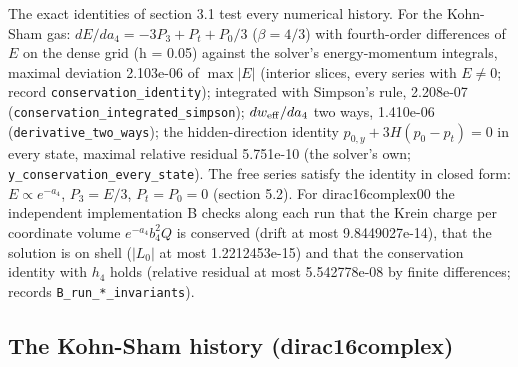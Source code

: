 \documentclass[11pt]{article}
\begin{document}
The exact identities of section 3.1 test every numerical history. For the Kohn-Sham gas: $dE/da_4 = -3P_3 + P_t + P_0/3$ ($\beta = 4/3$) with fourth-order differences of $E$ on the dense grid (h = 0.05) against the solver's energy-momentum integrals, maximal deviation 2.103e-06 of $\max\lvert E\rvert$ (interior slices, every series with $E \neq 0$; record \texttt{conserva\allowbreak{}tion\_ide\allowbreak{}ntity}); integrated with Simpson's rule, 2.208e-07 (\texttt{conserva\allowbreak{}tion\_int\allowbreak{}egrated\_\allowbreak{}simpson}); $dw_{\rm eff}/da_4$ two ways, 1.410e-06 (\texttt{derivati\allowbreak{}ve\_two\_w\allowbreak{}ays}); the hidden-direction identity $p_{0,y} + 3H(p_0 - p_t) = 0$ in every state, maximal relative residual 5.751e-10 (the solver's own; \texttt{y\_conser\allowbreak{}vation\_e\allowbreak{}very\_sta\allowbreak{}te}). The free series satisfy the identity in closed form: $E \propto e^{-a_4}$, $P_3 = E/3$, $P_t = P_0 = 0$ (section 5.2). For dirac16complex00 the independent implementation B checks along each run that the Krein charge per coordinate volume $e^{-a_4}b_4^2Q$ is conserved (drift at most 9.8449027e-14), that the solution is on shell ($|L_0|$ at most 1.2212453e-15) and that the conservation identity with $h_4$ holds (relative residual at most 5.542778e-08 by finite differences; records \texttt{B\_run\_*\_\allowbreak{}invarian\allowbreak{}ts}).

\subsection{The Kohn-Sham history (dirac16complex)}
\end{document}
